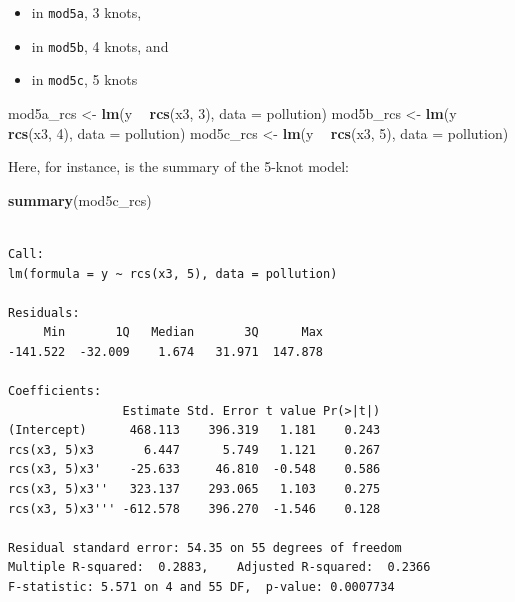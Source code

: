 \documentclass[]{book}
\newenvironment{Shaded}{\begin{snugshade}}{\end{snugshade}}
\newcommand{\KeywordTok}[1]{\textcolor[rgb]{0.13,0.29,0.53}{\textbf{#1}}}
\newcommand{\DataTypeTok}[1]{\textcolor[rgb]{0.13,0.29,0.53}{#1}}
\newcommand{\DecValTok}[1]{\textcolor[rgb]{0.00,0.00,0.81}{#1}}
\newcommand{\StringTok}[1]{\textcolor[rgb]{0.31,0.60,0.02}{#1}}
\newcommand{\OperatorTok}[1]{\textcolor[rgb]{0.81,0.36,0.00}{\textbf{#1}}}
\newcommand{\NormalTok}[1]{#1}
\providecommand{\tightlist}{%
  \setlength{\itemsep}{0pt}\setlength{\parskip}{0pt}}
\theoremstyle{definition}
\theoremstyle{definition}
\theoremstyle{definition}
\theoremstyle{remark}
\begin{document}
\begin{itemize}
\tightlist
\item
  in \texttt{mod5a}, 3 knots,
\item
  in \texttt{mod5b}, 4 knots, and
\item
  in \texttt{mod5c}, 5 knots
\end{itemize}

\begin{Shaded}
\begin{Highlighting}[]
\NormalTok{mod5a_rcs <-}\StringTok{ }\KeywordTok{lm}\NormalTok{(y }\OperatorTok{~}\StringTok{ }\KeywordTok{rcs}\NormalTok{(x3, }\DecValTok{3}\NormalTok{), }\DataTypeTok{data =}\NormalTok{ pollution)}
\NormalTok{mod5b_rcs <-}\StringTok{ }\KeywordTok{lm}\NormalTok{(y }\OperatorTok{~}\StringTok{ }\KeywordTok{rcs}\NormalTok{(x3, }\DecValTok{4}\NormalTok{), }\DataTypeTok{data =}\NormalTok{ pollution)}
\NormalTok{mod5c_rcs <-}\StringTok{ }\KeywordTok{lm}\NormalTok{(y }\OperatorTok{~}\StringTok{ }\KeywordTok{rcs}\NormalTok{(x3, }\DecValTok{5}\NormalTok{), }\DataTypeTok{data =}\NormalTok{ pollution)}
\end{Highlighting}
\end{Shaded}

Here, for instance, is the summary of the 5-knot model:

\begin{Shaded}
\begin{Highlighting}[]
\KeywordTok{summary}\NormalTok{(mod5c_rcs)}
\end{Highlighting}
\end{Shaded}

\begin{verbatim}

Call:
lm(formula = y ~ rcs(x3, 5), data = pollution)

Residuals:
     Min       1Q   Median       3Q      Max 
-141.522  -32.009    1.674   31.971  147.878 

Coefficients:
                Estimate Std. Error t value Pr(>|t|)
(Intercept)      468.113    396.319   1.181    0.243
rcs(x3, 5)x3       6.447      5.749   1.121    0.267
rcs(x3, 5)x3'    -25.633     46.810  -0.548    0.586
rcs(x3, 5)x3''   323.137    293.065   1.103    0.275
rcs(x3, 5)x3''' -612.578    396.270  -1.546    0.128

Residual standard error: 54.35 on 55 degrees of freedom
Multiple R-squared:  0.2883,    Adjusted R-squared:  0.2366 
F-statistic: 5.571 on 4 and 55 DF,  p-value: 0.0007734
\end{verbatim}
\end{document}
